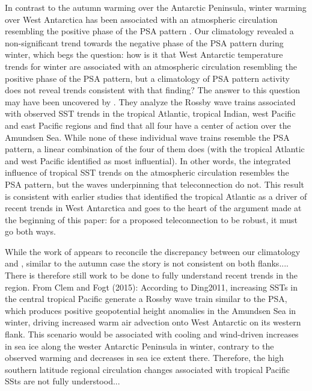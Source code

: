 In contrast to the autumn warming over the Antarctic Peninsula, winter warming over West Antarctica has been associated with an atmospheric circulation resembling the positive phase of the PSA pattern \citep{Ding2011}. Our climatology revealed a non-significant trend towards the negative phase of the PSA pattern during winter, which begs the question: how is it that West Antarctic temperature trends for winter are associated with an atmospheric circulation resembling the positive phase of the PSA pattern, but a climatology of PSA pattern activity does not reveal trends consistent with that finding? The answer to this question may have been uncovered by \citet{Li2015a}. They analyze the Rossby wave trains associated with observed SST trends in the tropical Atlantic, tropical Indian, west Pacific and east Pacific regions and find that all four have a center of action over the Amundsen Sea. While none of these individual wave trains resemble the PSA pattern, a linear combination of the four of them does (with the tropical Atlantic and west Pacific identified as most influential). In other words, the integrated influence of tropical SST trends on the atmospheric circulation resembles the PSA pattern, but the waves underpinning that teleconnection do not. This result is consistent with earlier studies that identified the tropical Atlantic as a driver of recent trends in West Antarctica \citep{Li2014,Simpkins2014} and goes to the heart of the argument made at the beginning of this paper: for a proposed teleconnection to be robust, it must go both ways. 

While the work of \citet{Li2015a} appears to reconcile the discrepancy between our climatology and \citet{Ding2011}, similar to the autumn case the story is not consistent on both flanks.... There is therefore still work to be done to fully understand recent trends in the region.
From Clem and Fogt (2015): According to Ding2011, increasing SSTs in the central tropical Pacific generate a Rossby wave train similar to the PSA, which produces positive geopotential height anomalies in the Amundsen Sea in winter, driving increased warm air advection onto West Antarctic on its western flank. This scenario would be associated with cooling and wind-driven increases in sea ice along the wester Antarctic Peninsula in winter, contrary to the observed warming and decreases in sea ice extent there. Therefore, the high southern latitude regional circulation changes associated with tropical Pacific SSts are not fully understood...

